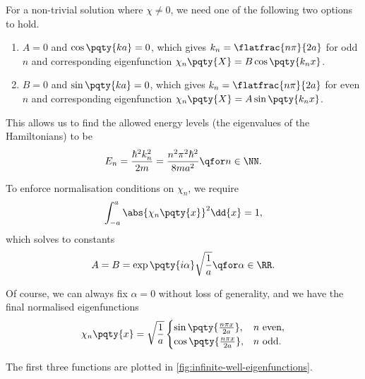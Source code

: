 For a non-trivial solution where \(\chi \neq 0\), we need one of the following two options to hold.

\begin{enumerate}[label=(\roman*)]
    \item \(A = 0\) and \(\cos \pqty{ka} = 0\), which gives \(k_n = \flatfrac{n \pi}{2 a}\) for odd \(n\) and corresponding eigenfunction \(\chi_n\pqty{X} = B \cos \pqty{k_n x}\).
    \item \(B = 0\) and \(\sin \pqty{ka} = 0\), which gives \(k_n = \flatfrac{n \pi}{2 a}\) for even \(n\) and corresponding eigenfunction \(\chi_n\pqty{X} = A \sin \pqty{k_n x}\).
\end{enumerate}

This allows us to find the allowed energy levels (the eigenvalues of the Hamiltonians) to be
\begin{equation}
    E_n = \frac{\hbar^2 k_n^2}{2 m} = \frac{n^2 \pi^2 \hbar^2}{8 m a^2} \qfor n \in \NN.
\end{equation}

To enforce normalisation conditions on \(\chi_n\), we require
\begin{equation}
    \int_{-a}^{a} \abs{\chi_n \pqty{x}}^2 \dd{x} = 1,
\end{equation}
which solves to constants
\begin{equation}
    A = B = \exp\pqty{i \alpha} \sqrt{\frac{1}{a}} \qfor \alpha \in \RR.
\end{equation}

Of course, we can always fix \(\alpha = 0\) without loss of generality, and we have the final normalised eigenfunctions
\begin{equation}
    \chi_n\pqty{x} = \sqrt{\frac{1}{a}}
    \begin{cases}
        \sin \pqty{\frac{n \pi x}{2a}}, & n \text{ even}, \\
        \cos \pqty{\frac{n \pi x}{2a}}, & n \text{ odd}.
    \end{cases}
\end{equation}

The first three functions are plotted in \autoref{fig:infinite-well-eigenfunctions}.


